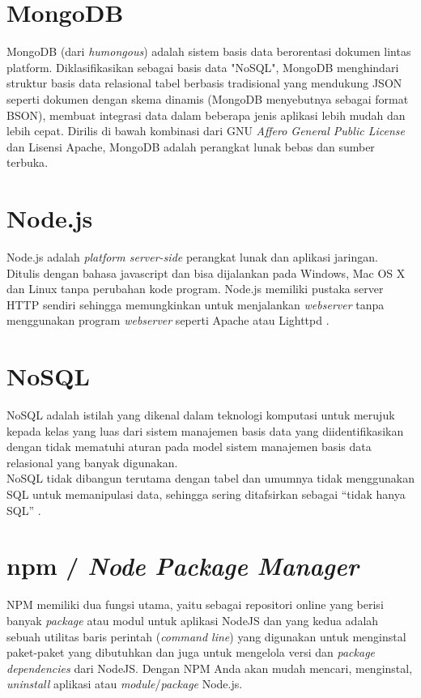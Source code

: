 	
	\section{  MongoDB}
	MongoDB (dari \textit{humongous}) adalah sistem basis data berorentasi dokumen lintas platform. Diklasifikasikan sebagai basis data "NoSQL", MongoDB menghindari struktur basis data relasional tabel berbasis tradisional yang mendukung JSON seperti dokumen dengan skema dinamis (MongoDB menyebutnya sebagai format BSON), membuat integrasi data dalam beberapa jenis aplikasi lebih mudah dan lebih cepat. Dirilis di bawah kombinasi dari GNU \textit{Affero General Public License }dan Lisensi Apache, MongoDB adalah perangkat lunak bebas dan sumber terbuka\cite{noauthor_mongodb_2017}.
	    
	\section{Node.js}
	Node.js adalah \textit{platform server-side} perangkat lunak dan aplikasi jaringan. Ditulis dengan bahasa javascript dan bisa dijalankan pada Windows, Mac OS X dan Linux tanpa perubahan kode program. Node.js memiliki pustaka server HTTP sendiri sehingga memungkinkan untuk menjalankan \textit{webserver} tanpa menggunakan program \textit{webserver} seperti Apache atau Lighttpd \cite{noauthor_node.js_2014}.
	    
	\section{NoSQL}
	NoSQL adalah istilah yang dikenal dalam teknologi komputasi untuk merujuk kepada kelas yang luas dari sistem manajemen basis data yang diidentifikasikan dengan tidak mematuhi aturan pada model sistem manajemen basis data relasional yang banyak digunakan.
	\\ \indent
	NoSQL tidak dibangun terutama dengan tabel dan umumnya tidak menggunakan SQL untuk memanipulasi data, sehingga sering ditafsirkan sebagai “tidak hanya SQL” \cite{wikipedia_nosql_nodate}.

	\section{  npm / \textit{Node Package Manager}}
	NPM memiliki dua fungsi utama, yaitu sebagai repositori online yang berisi banyak \textit{package} atau modul untuk aplikasi NodeJS dan yang kedua adalah sebuah utilitas baris perintah (\textit{command line}) yang digunakan untuk menginstal paket-paket yang dibutuhkan dan juga untuk mengelola versi dan \textit{package dependencies} dari NodeJS. Dengan NPM Anda akan mudah mencari, menginstal, \textit{uninstall} aplikasi atau \textit{module}/\textit{package }Node.js\cite{azurri_node_2016}.
	

